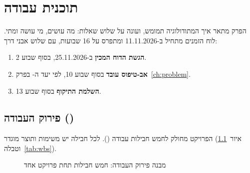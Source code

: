 \chapter{תוכנית עבודה}\label{ch:workplan}

הפרק מתאר איך המתודולוגיה תמומש, ועונה על שלוש שאלות: מה עושים, מי עושה ומתי. לוח הזמנים מתחיל ב-11.11.2026 ומתפרס על 16 שבועות, עם שלוש אבני דרך:
\begin{enumerate}
\item \textbf{הגשת הדוח המכין} ב-25.11.2026, בסוף שבוע 2.
\item \textbf{אב-טיפוס עובד} בסוף שבוע 10, לפי יעד ה- בפרק~\ref{ch:problem}.
\item \textbf{השלמת התיקוף} בסוף שבוע 13.
\end{enumerate}

\section{פירוק העבודה ()}\label{sec:wbs}

הפרויקט מחולק לחמש חבילות עבודה (). לכל חבילה יש משימות ותוצר מוגדר (איור~\ref{fig:wbs} וטבלה~\ref{tab:wbs}).

\begin{figure}[!htbp]
\centering
{}
\caption{מבנה פירוק העבודה: חמש חבילות תחת פרויקט אחד}\label{fig:wbs}
\end{figure}

